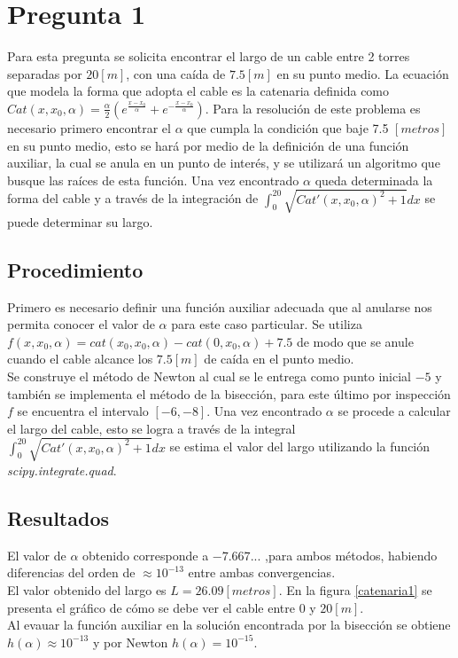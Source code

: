 \documentclass[a4paper, 11pt, spanish]{article}
\begin{document}
\section{Pregunta 1}
Para esta pregunta se solicita encontrar el largo de un cable entre 2 torres separadas por $20[m]$, con una caída de $7.5[m]$ en su punto medio. La ecuación que modela la forma que adopta el cable es la catenaria definida como $Cat(x,x_0,\alpha) = \frac{\alpha}{2}(e^{\frac{x-x_0}{\alpha}} + e^{-\frac{x-x_0}{\alpha}})$. Para la resolución de este problema es necesario primero encontrar el $\alpha$ que cumpla la condición que baje 7.5 $[metros]$ en su punto medio, esto se hará por medio de la definición de una función auxiliar, la cual se anula en un punto de interés, y se utilizará un algoritmo que busque las raíces de esta función. Una vez encontrado $\alpha$ queda determinada la forma del cable y a través de la integración de $\int_0^{20} \sqrt{Cat'(x,x_0,\alpha)^2 + 1} dx $ se puede determinar su largo.

\subsection{Procedimiento}
Primero es necesario definir una función auxiliar adecuada que al anularse nos permita conocer el valor de $\alpha$ para este caso particular. Se utiliza $f(x,x_0,\alpha) = cat(x_0,x_0,\alpha) - cat(0,x_0,\alpha) + 7.5$ de modo que se anule cuando el cable alcance los $7.5 [m]$ de caída en el punto medio.\\ 
Se construye el método de Newton al cual se le entrega como punto inicial $-5$ y también se implementa el método de la bisección, para este último por inspección $f$ se encuentra el intervalo $[-6,-8]$.
Una vez encontrado $\alpha$ se procede a calcular el largo del cable, esto se logra a través de la integral $\int_0^{20} \sqrt{Cat'(x,x_0,\alpha)^2 + 1} dx $ se estima el valor del largo utilizando la función \textit{scipy.integrate.quad}.

\subsection{Resultados}
El valor de $\alpha$ obtenido corresponde a $-7.667...$ ,para ambos métodos, habiendo diferencias del orden de $\approx 10^{-13}$ entre ambas convergencias. \\
El valor obtenido del largo es $L = 26.09[metros]$. En la figura \ref{catenaria1} se presenta el gráfico de cómo se debe ver el cable entre $0$ y $20 [m]$.\\
Al evauar la función auxiliar en la solución encontrada por la bisección se obtiene $h(\alpha) \approx 10^{-13}$ y por Newton $h(\alpha) = 10^{-15}$.
\end{document}

